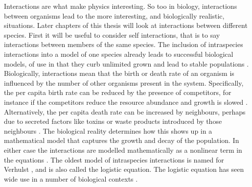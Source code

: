 Interactions are what make physics interesting. 
So too in biology, interactions between organisms lead to the more interesting, and biologically realistic, situations. 
Later chapters of this thesis will look at interactions between different species. 
First it will be useful to consider self interactions, that is to say interactions between members of the same species. 
The inclusion of intraspecies interactions into a model of one species already leads to successful biological models, of use in that they curb unlimited grown and lead to stable populations \cite{Verhulst1838,Ovaskainen2010,Newman2004,Allen2005,Assaf2009,Greenhalgh1990,Hubbell2001,Adler2010,Kessler2007,Brock2006,Norden1982,Dushoff2000}. 
Biologically, interactions mean that the birth or death rate of an organism is influenced by the number of other organisms present in the system. 
Specifically, the per capita birth rate can be reduced by the presence of competitors, for instance if the competitors reduce the resource abundance and growth is slowed \cite{Nadell2008,Vulic2001}. 
Alternatively, the per capita death rate can be increased by neighbours, perhaps due to secreted factors like toxins or waste products introduced by those neighbours \cite{Greenhalgh1990,VanMelderen2009,Rankin2012}. 
The biological reality determines how this shows up in a mathematical model that captures the growth and decay of the population. 
In either case the interactions are modelled mathematically as a nonlinear term in the equations \cite{Greenhalgh1990,Ovaskainen2010,Assaf2010,Allen2003a,Norden1982,Newman2004,Allen2005,Nasell2001}. %
%
The oldest model of intraspecies interactions is named for Verhulst \cite{Verhulst1838}, and is also called the logistic equation. 
The logistic equation has seen wide use in a number of biological contexts \cite{Ovaskainen2010,Newman2004,Allen2005,Assaf2009,Greenhalgh1990,Hubbell2001,Adler2010,Kessler2007,Brock2006,Norden1982,Dushoff2000}. %

